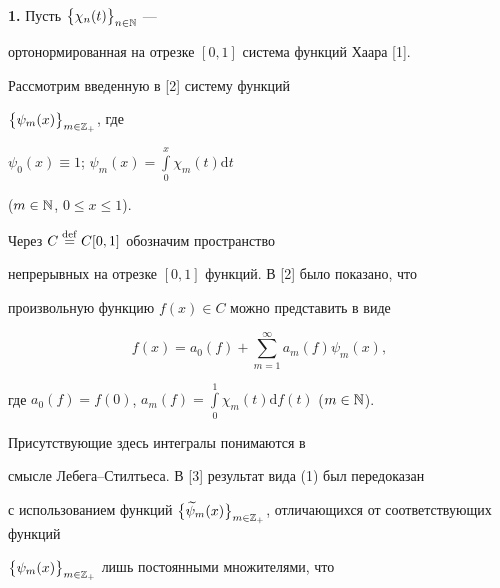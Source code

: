 

\pagestyle{plain} %







\maketitle


\label{begin}











{\bf 1.} Пусть $\big\{\chi_n(t)\big\}_{n\in\Bbb{N}}$ ---


ортонормированная на отрезке $[0,1]$ система функций Хаара [1].


Рассмотрим введенную в [2] систему функций


$\big\{\psi_m(x)\big\}_{m\in \Bbb{Z}_+}$, где 


$\psi_0(x) \equiv 1$; $\psi_m(x) = \int\limits_0^x \chi_m(t)\mathrm{d} t$


($m \in \Bbb{N}$, $0 \leqslant x \leqslant 1$).


Через $C\overset{\mathrm{def}}{=}{} C[0,1]$ обозначим пространство


непрерывных на отрезке $[0,1]$ функций. В [2] было показано, что


произвольную функцию $f(x)\in C$ можно представить в виде


\begin{equation}


f(x)=a_0(f) + \sum_{m=1}^{\infty} a_m(f) \psi_m(x),


\end{equation}


где $a_0(f) = f(0)$, $a_m(f) = \int\limits_0^1


\chi_{m} (t)\mathrm{d}f(t)$ ($m \in \Bbb{N}$).


Присутствующие здесь интегралы понимаются в


смысле Лебега--Стилтьеса. В [3] результат вида (1) был передоказан 


с использованием функций $\big\{\widetilde{\psi}_m(x)\big\}_{m\in


\Bbb{Z}_+}$, отличающихся от соответствующих функций


$\big\{\psi_m(x)\big\}_{m\in \Bbb{Z}_+}$ лишь постоянными множителями, что


